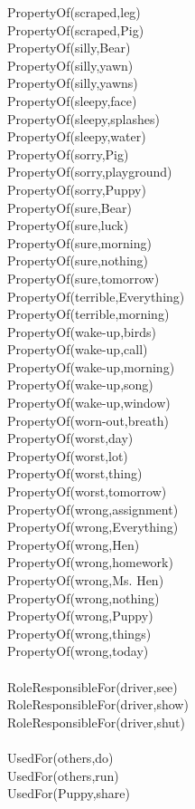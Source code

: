 \begin{multicols}{2}
\begin{footnotesize}
PropertyOf(scraped,leg) \\
PropertyOf(scraped,Pig) \\
PropertyOf(silly,Bear) \\
PropertyOf(silly,yawn) \\
PropertyOf(silly,yawns) \\
PropertyOf(sleepy,face) \\
PropertyOf(sleepy,splashes) \\
PropertyOf(sleepy,water) \\
PropertyOf(sorry,Pig) \\
PropertyOf(sorry,playground) \\
PropertyOf(sorry,Puppy) \\
PropertyOf(sure,Bear) \\
PropertyOf(sure,luck) \\
PropertyOf(sure,morning) \\
PropertyOf(sure,nothing) \\
PropertyOf(sure,tomorrow) \\
PropertyOf(terrible,Everything) \\
PropertyOf(terrible,morning) \\
PropertyOf(wake-up,birds) \\
PropertyOf(wake-up,call) \\
PropertyOf(wake-up,morning) \\
PropertyOf(wake-up,song) \\
PropertyOf(wake-up,window) \\
PropertyOf(worn-out,breath) \\
PropertyOf(worst,day) \\
PropertyOf(worst,lot) \\
PropertyOf(worst,thing) \\
PropertyOf(worst,tomorrow) \\
PropertyOf(wrong,assignment) \\
PropertyOf(wrong,Everything) \\
PropertyOf(wrong,Hen) \\
PropertyOf(wrong,homework) \\
PropertyOf(wrong,Ms. Hen) \\
PropertyOf(wrong,nothing) \\
PropertyOf(wrong,Puppy) \\
PropertyOf(wrong,things) \\
PropertyOf(wrong,today) \\
~\\
RoleResponsibleFor(driver,see) \\
RoleResponsibleFor(driver,show) \\
RoleResponsibleFor(driver,shut) \\
~\\
UsedFor(others,do) \\
UsedFor(others,run) \\
UsedFor(Puppy,share) \\
\end{footnotesize}
\end{multicols}

